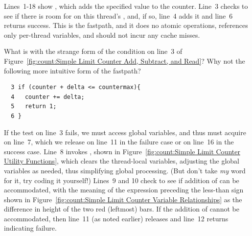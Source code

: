 Lines~1-18 show , which adds the specified value 
to the counter.
Line~3 checks to see if there is room for  on this thread's
, and, if so, line~4 adds it and line~6 returns success.
This is the  fastpath, and it does no atomic operations,
references only per-thread variables, and should not incur any cache misses.

\QuickQuiz{}
	What is with the strange form of the condition on line~3 of
	Figure~\ref{fig:count:Simple Limit Counter Add, Subtract, and Read}?
	Why not the following more intuitive form of the fastpath?

	\vspace{5pt}
	\begin{minipage}[t]{\columnwidth}
	\small
	\begin{verbatim}
  3 if (counter + delta <= countermax){
  4   counter += delta;
  5   return 1;
  6 }
	\end{verbatim}
	\end{minipage}
	\vspace{5pt}
 \QuickQuizEnd

If the test on line~3 fails, we must access global variables, and thus
must acquire  on line~7, which we release on line~11
in the failure case or on line~16 in the success case.
Line~8 invokes , shown in
Figure~\ref{fig:count:Simple Limit Counter Utility Functions},
which clears the thread-local variables, adjusting the global variables
as needed, thus simplifying global processing.
(But don't take \emph{my} word for it, try coding it yourself!)
Lines~9 and 10 check to see if addition of  can be accommodated,
with the meaning of the expression preceding the less-than sign shown in
Figure~\ref{fig:count:Simple Limit Counter Variable Relationships}
as the difference in height of the two red (leftmost) bars.
If the addition of  cannot be accommodated, then
line~11 (as noted earlier) releases  and line~12
returns indicating failure.

